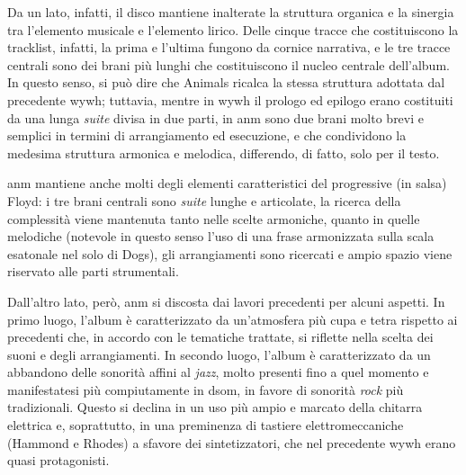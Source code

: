 \documentclass[class=book, crop=false, oneside, 12pt]{standalone}
\begin{document}
    Da un lato, infatti, il disco mantiene inalterate la struttura organica e la sinergia tra l'elemento musicale e l'elemento lirico. Delle cinque tracce che costituiscono la tracklist, infatti, la prima e l'ultima fungono  da cornice narrativa, e le tre tracce centrali sono dei brani più lunghi che costituiscono il nucleo centrale dell'album. In questo senso, si può dire che Animals ricalca la stessa struttura adottata dal precedente \acrlong{wywh}; tuttavia, mentre in \acrshort{wywh} il prologo ed epilogo erano costituiti da una lunga \emph{suite} divisa in due parti, in \acrshort{anm} sono due brani molto brevi e semplici in termini di arrangiamento ed esecuzione, e che condividono la medesima struttura armonica e melodica, differendo, di fatto, solo per il testo. 

    \acrshort{anm} mantiene anche molti degli elementi caratteristici del progressive (in salsa) Floyd: i tre brani centrali sono \emph{suite} lunghe e articolate, la ricerca della complessità viene mantenuta tanto nelle scelte armoniche, quanto in quelle melodiche (notevole in questo senso l'uso di una frase armonizzata sulla scala esatonale nel solo di Dogs), gli arrangiamenti sono ricercati e ampio spazio viene riservato alle parti strumentali.

    Dall'altro lato, però, \acrshort{anm} si discosta dai lavori precedenti per alcuni aspetti. In primo luogo, l'album è caratterizzato da un'atmosfera più cupa e tetra rispetto ai precedenti che, in accordo con le tematiche trattate, si riflette nella scelta dei suoni e degli arrangiamenti. In secondo luogo, l'album è caratterizzato da un abbandono delle sonorità affini al \emph{jazz}, molto presenti fino a quel momento e manifestatesi più compiutamente in \acrshort{dsom}, in favore di sonorità \emph{rock} più tradizionali. Questo si declina  in un uso più ampio e marcato della chitarra elettrica e, soprattutto, in una preminenza di tastiere elettromeccaniche (Hammond e Rhodes) a sfavore dei sintetizzatori, che nel precedente \acrshort{wywh} erano quasi protagonisti.
\end{document}
